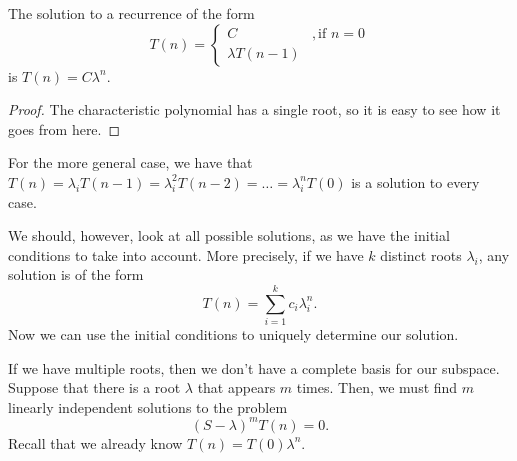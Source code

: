 \begin{lemma}
    The solution to a recurrence of the form \[
    T(n) = \begin{cases}
	C &, \text{if }n=0 \\
	\lambda T(n-1) &
    \end{cases}
    \] is $T(n) = C\lambda^{n}$.
\end{lemma}
\begin{proof}
    The characteristic polynomial has a single root, so it is easy to see how it goes from here.
\end{proof}

For the more general case, we have that $T(n) = \lambda_i T(n-1)=\lambda_i^{2} T(n-2) = \ldots = \lambda_i^{n}T(0)$ is a solution to every case.

We should, however, look at all possible solutions, as we have the initial conditions to take into account.
More precisely, if we have $k$ distinct roots $\lambda_i$, any solution is of the form \[
T(n) = \sum_{i=1}^{k} c_i \lambda_i^{n}
.\] 
Now we can use the initial conditions to uniquely determine our solution.

If we have multiple roots, then we don't have a complete basis for our subspace.
Suppose that there is a root $\lambda$ that appears $m$ times.
Then, we must find $m$ linearly independent solutions to the problem \[
    (S-\lambda)^{m}T(n) = 0
.\] 
Recall that we already know $T(n) = T(0)\lambda^{n}$.


